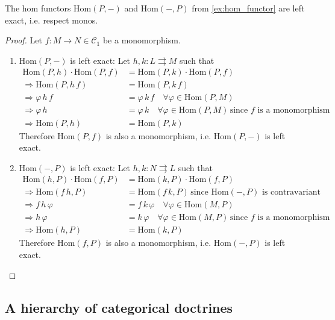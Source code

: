 \begin{lemma}\label{la:hom_functor_left_exact}
The hom functors $\mathrm{Hom}(P,-)$ and $\mathrm{Hom}(-,P)$ from \ref{ex:hom_functor} are left exact, i.e. respect monos.
\end{lemma}
\begin{proof}
Let $f : M \rightarrow N \in \mathcal{C}_{1}$ be a monomorphism.
\begin{enumerate}
\renewcommand{\labelenumi}{(\theenumi)}
\item $\mathrm{Hom}(P,-)$ is left exact: Let $h, k : L \rightrightarrows M$ such that
\begin{align*}
\mathrm{Hom}(P,h) \cdot \mathrm{Hom}(P,f) &= \mathrm{Hom}(P,k) \cdot \mathrm{Hom}(P,f) \\
\Rightarrow \mathrm{Hom}(P,h\,f) &= \mathrm{Hom}(P,k\,f) \\
\Rightarrow \varphi\,h\,f &= \varphi\,k\,f \quad \forall \varphi \in \mathrm{Hom}(P,M) \\
\Rightarrow \varphi\,h &= \varphi\,k \quad \forall \varphi \in \mathrm{Hom}(P,M)\,\text{since $f$ is a monomorphism}\, \\
\Rightarrow \mathrm{Hom}(P,h) &= \mathrm{Hom}(P,k)
\end{align*}
Therefore $\mathrm{Hom}(P,f)$ is also a monomorphism, i.e. $\mathrm{Hom}(P,-)$ is left exact.
\item $\mathrm{Hom}(-,P)$ is left exact: Let $h, k : N \rightrightarrows L$ such that
\begin{align*}
\mathrm{Hom}(h,P) \cdot \mathrm{Hom}(f,P) &= \mathrm{Hom}(k,P) \cdot \mathrm{Hom}(f,P) \\
\Rightarrow \mathrm{Hom}(f\,h,P) &= \mathrm{Hom}(f\,k,P)\,\text{since $\mathrm{Hom}(-,P)$ is contravariant} \\
\Rightarrow f\,h\,\varphi &=f\,k\,\varphi \quad \forall \varphi \in \mathrm{Hom}(M,P) \\
\Rightarrow h\,\varphi &= k\,\varphi \quad \forall \varphi \in \mathrm{Hom}(M,P)\,\text{since $f$ is a monomorphism}\, \\
\Rightarrow \mathrm{Hom}(h,P) &= \mathrm{Hom}(k,P)
\end{align*}
Therefore $\mathrm{Hom}(f,P)$ is also a monomorphism, i.e. $\mathrm{Hom}(-,P)$ is left exact.
\end{enumerate}
\end{proof}

\subsection{A hierarchy of categorical doctrines}


